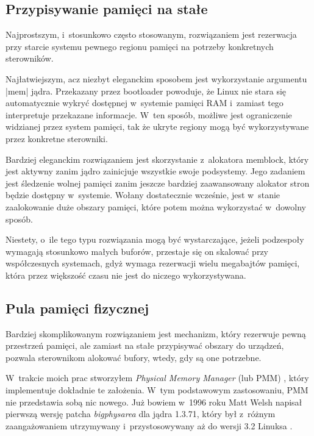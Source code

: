 \subsection{Przypisywanie pamięci na stałe}

Najprostszym, i~stosunkowo często stosowanym, rozwiązaniem jest
rezerwacja przy starcie systemu pewnego regionu pamięci na potrzeby
konkretnych sterowników.

Najłatwiejszym, acz niezbyt eleganckim sposobem jest wykorzystanie
argumentu \code|mem| jądra.  Przekazany przez bootloader powoduje, że
Linux nie stara się automatycznie wykryć dostępnej w~systemie pamięci
RAM i~zamiast tego interpretuje przekazane informacje.  W~ten sposób,
możliwe jest ograniczenie widzianej przez system pamięci, tak że
ukryte regiony mogą być wykorzystywane przez konkretne sterowniki.

Bardziej eleganckim rozwiązaniem jest skorzystanie z~alokatora
memblock, który jest aktywny zanim jądro zainicjuje wszystkie swoje
podsystemy.  Jego zadaniem jest śledzenie wolnej pamięci zanim jeszcze
bardziej zaawansowany alokator stron będzie dostępny w~systemie.
Wołany dostatecznie wcześnie, jest w~stanie zaalokowanie duże obszary
pamięci, które potem można wykorzystać w~dowolny sposób.

Niestety, o~ile tego typu rozwiązania mogą być wystarczające, jeżeli
podzespoły wymagają stosunkowo małych buforów, przestaje się on
skalować przy współczesnych systemach, gdyż wymaga rezerwacji wielu
megabajtów pamięci, która przez większość czasu nie jest do niczego
wykorzystywana.

\subsection{Pula pamięci fizycznej}

Bardziej skomplikowanym rozwiązaniem jest mechanizm, który rezerwuje
pewną przestrzeń pamięci, ale zamiast na stałe przypisywać obszary do
urządzeń, pozwala sterownikom alokować bufory, wtedy, gdy są one
potrzebne.

W~trakcie moich prac stworzyłem {\it Physical Memory Manager} (lub
PMM) \autocite{patch:pmm}, który implementuje dokładnie te
założenia. W~tym podstawowym zastosowaniu, PMM nie przedstawia sobą nic
nowego.  Już bowiem w~1996 roku Matt Welsh napisał pierwszą wersję
patcha \emph{bigphysarea} dla jądra 1.3.71, który był z~różnym
zaangażowaniem utrzymywany i~przystosowywany aż do wersji
3.2 Linuksa \autocite{patch:bigphys}.

